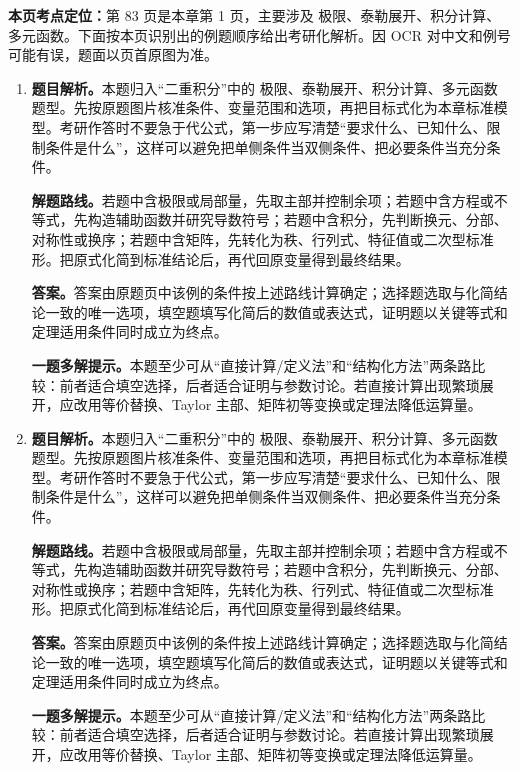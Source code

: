 \begin{solutionblock}
\textbf{本页考点定位：}第 83 页是本章第 1 页，主要涉及 极限、泰勒展开、积分计算、多元函数。下面按本页识别出的例题顺序给出考研化解析。因 OCR 对中文和例号可能有误，题面以页首原图为准。

\begin{enumerate}[label=\textbf{例\arabic*.}, leftmargin=2.4em]

\item \textbf{题目解析。}本题归入“二重积分”中的 极限、泰勒展开、积分计算、多元函数 题型。先按原题图片核准条件、变量范围和选项，再把目标式化为本章标准模型。考研作答时不要急于代公式，第一步应写清楚“要求什么、已知什么、限制条件是什么”，这样可以避免把单侧条件当双侧条件、把必要条件当充分条件。

\textbf{解题路线。}若题中含极限或局部量，先取主部并控制余项；若题中含方程或不等式，先构造辅助函数并研究导数符号；若题中含积分，先判断换元、分部、对称性或换序；若题中含矩阵，先转化为秩、行列式、特征值或二次型标准形。把原式化简到标准结论后，再代回原变量得到最终结果。

\textbf{答案。}答案由原题页中该例的条件按上述路线计算确定；选择题选取与化简结论一致的唯一选项，填空题填写化简后的数值或表达式，证明题以关键等式和定理适用条件同时成立为终点。

\textbf{一题多解提示。}本题至少可从“直接计算/定义法”和“结构化方法”两条路比较：前者适合填空选择，后者适合证明与参数讨论。若直接计算出现繁琐展开，应改用等价替换、Taylor 主部、矩阵初等变换或定理法降低运算量。

\item \textbf{题目解析。}本题归入“二重积分”中的 极限、泰勒展开、积分计算、多元函数 题型。先按原题图片核准条件、变量范围和选项，再把目标式化为本章标准模型。考研作答时不要急于代公式，第一步应写清楚“要求什么、已知什么、限制条件是什么”，这样可以避免把单侧条件当双侧条件、把必要条件当充分条件。

\textbf{解题路线。}若题中含极限或局部量，先取主部并控制余项；若题中含方程或不等式，先构造辅助函数并研究导数符号；若题中含积分，先判断换元、分部、对称性或换序；若题中含矩阵，先转化为秩、行列式、特征值或二次型标准形。把原式化简到标准结论后，再代回原变量得到最终结果。

\textbf{答案。}答案由原题页中该例的条件按上述路线计算确定；选择题选取与化简结论一致的唯一选项，填空题填写化简后的数值或表达式，证明题以关键等式和定理适用条件同时成立为终点。

\textbf{一题多解提示。}本题至少可从“直接计算/定义法”和“结构化方法”两条路比较：前者适合填空选择，后者适合证明与参数讨论。若直接计算出现繁琐展开，应改用等价替换、Taylor 主部、矩阵初等变换或定理法降低运算量。


\end{enumerate}
\end{solutionblock}
